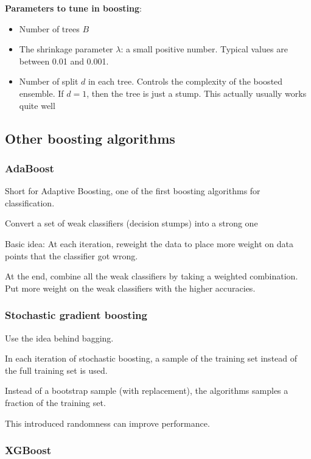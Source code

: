 \noindent\textbf{Parameters to tune in boosting}:

\begin{itemize}
    \item Number of trees $B$
    \item The shrinkage parameter $\lambda$: a small positive number. Typical values are between 0.01 and 0.001.
    \item Number of split $d$ in each tree. Controls the complexity of the boosted ensemble. If $d=1$, then the tree is just a stump. This actually usually works quite well
\end{itemize}

\subsection{Other boosting algorithms}

\subsubsection{AdaBoost}

\indent 

Short for Adaptive Boosting, one of the first boosting algorithms for classification.

Convert a set of weak classifiers (decision stumps) into a strong one

Basic idea: At each iteration, reweight the data to place more weight on data points that the classifier got wrong.

At the end, combine all the weak classifiers by taking a weighted combination. Put more weight on the weak classifiers with the higher accuracies.

\subsubsection{Stochastic gradient boosting}

\indent 

Use the idea behind bagging.

In each iteration of stochastic boosting, a sample of the training set instead of the full training set is used.

Instead of a bootstrap sample (with replacement), the algorithms samples a fraction of the training set.

This introduced randomness can improve performance.

\subsubsection{XGBoost}

